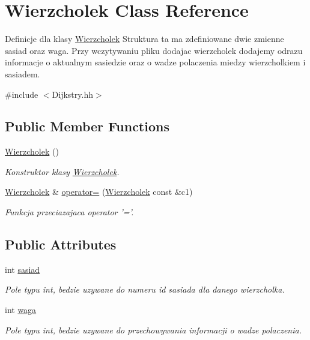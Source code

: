 \hypertarget{class_wierzcholek}{\section{Wierzcholek Class Reference}
\label{class_wierzcholek}
}


Definicje dla klasy \hyperlink{class_wierzcholek}{Wierzcholek} Struktura ta ma zdefiniowane dwie zmienne sasiad oraz waga. Przy wczytywaniu pliku dodajac wierzcholek dodajemy odrazu informacje o aktualnym sasiedzie oraz o wadze polaczenia miedzy wierzcholkiem i sasiadem.  




{\ttfamily \#include $<$Dijkstry.\-hh$>$}

\subsection*{Public Member Functions}
\begin{DoxyCompactItemize}
\item 
\hyperlink{class_wierzcholek_aecbad5c4116749559a7b57888fab2f01}{Wierzcholek} ()
\begin{DoxyCompactList}\small\item\em Konstruktor klasy \hyperlink{class_wierzcholek}{Wierzcholek}. \end{DoxyCompactList}\item 
\hyperlink{class_wierzcholek}{Wierzcholek} \& \hyperlink{class_wierzcholek_a8ed21ba858df5ba6857b22f9a95929d8}{operator=} (\hyperlink{class_wierzcholek}{Wierzcholek} const \&c1)
\begin{DoxyCompactList}\small\item\em Funkcja przeciazajaca operator '='. \end{DoxyCompactList}\end{DoxyCompactItemize}
\subsection*{Public Attributes}
\begin{DoxyCompactItemize}
\item 
int \hyperlink{class_wierzcholek_a064e9d988e2bf41110c06f50ee4a7549}{sasiad}
\begin{DoxyCompactList}\small\item\em Pole typu int, bedzie uzywane do numeru id sasiada dla danego wierzcholka. \end{DoxyCompactList}\item 
int \hyperlink{class_wierzcholek_a75fca22ce5c86f0cbf29276f7f5204c3}{waga}
\begin{DoxyCompactList}\small\item\em Pole typu int, bedzie uzywane do przechowywania informacji o wadze polaczenia. \end{DoxyCompactList}\end{DoxyCompactItemize}



